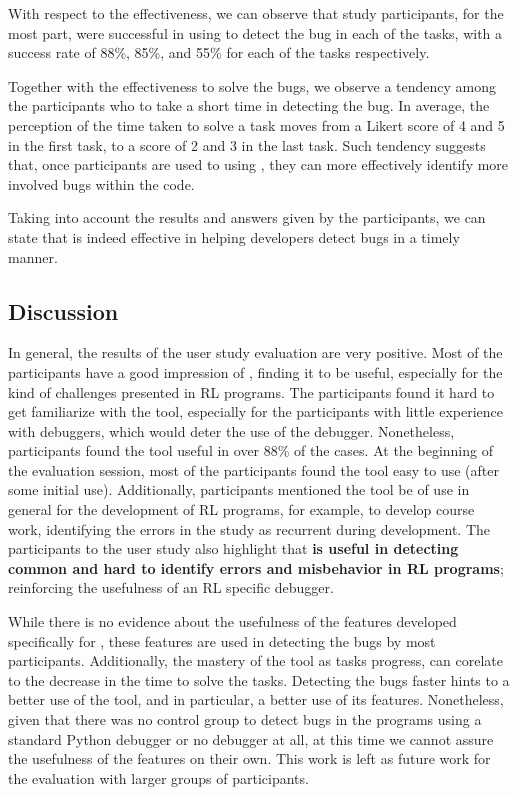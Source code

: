 \begin{enumerate}[label=\textbf{RQ.\arabic*}]
  With respect to the effectiveness, we 
  can observe that study participants, for the most part, were successful in using \flik to detect the 
  bug in each of the tasks, with a success rate of 88\%, 85\%, and 55\% for each of the tasks 
  respectively.
  
  Together with the effectiveness to solve the bugs, we observe a tendency among the participants who 
  to take a short time in detecting the bug. In average, the perception of the time taken to solve a task 
  moves from a Likert score of 4 and 5 in the first task, to a score of 2 and 3 in the last task. Such 
  tendency suggests that, once participants are used to using \flik, they can more effectively identify 
  more involved bugs within the code.
  
  Taking into account the results and answers given by the participants, we can state that \flik is 
  indeed effective in helping developers detect bugs in a timely manner.
\end{enumerate}


\subsection{Discussion}
\label{sec:discussion}

In general, the results of the user study evaluation are very positive. Most of the participants have a 
good impression of \flik, finding it to be useful, especially for the kind of challenges presented in 
\ac{RL} programs. The participants found it hard to get familiarize with the tool, especially 
for the participants with little experience with debuggers, which would deter the use of the debugger. 
Nonetheless, participants found the tool useful in over 88\% of the cases. At the beginning of the 
evaluation session, most of the participants found the tool easy to use (after some initial use). 
Additionally, participants mentioned the tool be of use in general for the development of \ac{RL} 
programs, for example, to develop course work, identifying the errors in the study as recurrent 
during development. The participants to the user study also highlight that \textbf{\flik is useful in 
detecting common and hard to identify errors and misbehavior in \ac{RL} programs}; reinforcing the 
usefulness of an \ac{RL} specific debugger.

While there is no evidence about the usefulness of the features developed specifically for \flik, these 
features are used in detecting the bugs by most participants. Additionally, the mastery of the tool as 
tasks progress, can corelate to the decrease in the time to solve the tasks. Detecting the bugs faster 
hints to a better use of the tool, and in particular, a better use of its features. Nonetheless, given that 
there was no control group to detect bugs in the programs using a standard Python debugger or no 
debugger at all, at this time we cannot assure the usefulness of the features on their own. This work 
is left as future work for the evaluation with larger groups of participants.

